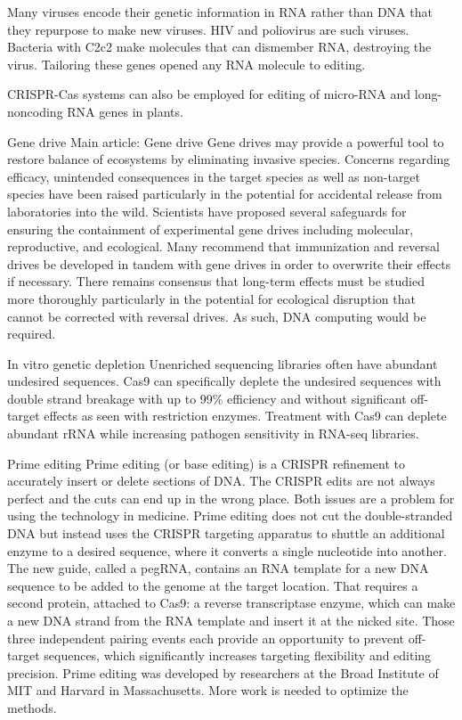 Many viruses encode their genetic information in RNA rather than DNA that they repurpose to make new viruses. HIV and poliovirus are such viruses. Bacteria with C2c2 make molecules that can dismember RNA, destroying the virus. Tailoring these genes opened any RNA molecule to editing.

CRISPR-Cas systems can also be employed for editing of micro-RNA and long-noncoding RNA genes in plants.

Gene drive
Main article: Gene drive
Gene drives may provide a powerful tool to restore balance of ecosystems by eliminating invasive species. Concerns regarding efficacy, unintended consequences in the target species as well as non-target species have been raised particularly in the potential for accidental release from laboratories into the wild. Scientists have proposed several safeguards for ensuring the containment of experimental gene drives including molecular, reproductive, and ecological. Many recommend that immunization and reversal drives be developed in tandem with gene drives in order to overwrite their effects if necessary. There remains consensus that long-term effects must be studied more thoroughly particularly in the potential for ecological disruption that cannot be corrected with reversal drives. As such, DNA computing would be required.

In vitro genetic depletion
Unenriched sequencing libraries often have abundant undesired sequences. Cas9 can specifically deplete the undesired sequences with double strand breakage with up to 99\% efficiency and without significant off-target effects as seen with restriction enzymes. Treatment with Cas9 can deplete abundant rRNA while increasing pathogen sensitivity in RNA-seq libraries.

Prime editing
Prime editing (or base editing) is a CRISPR refinement to accurately insert or delete sections of DNA. The CRISPR edits are not always perfect and the cuts can end up in the wrong place. Both issues are a problem for using the technology in medicine. Prime editing does not cut the double-stranded DNA but instead uses the CRISPR targeting apparatus to shuttle an additional enzyme to a desired sequence, where it converts a single nucleotide into another. The new guide, called a pegRNA, contains an RNA template for a new DNA sequence to be added to the genome at the target location. That requires a second protein, attached to Cas9: a reverse transcriptase enzyme, which can make a new DNA strand from the RNA template and insert it at the nicked site. Those three independent pairing events each provide an opportunity to prevent off-target sequences, which significantly increases targeting flexibility and editing precision. Prime editing was developed by researchers at the Broad Institute of MIT and Harvard in Massachusetts. More work is needed to optimize the methods.

